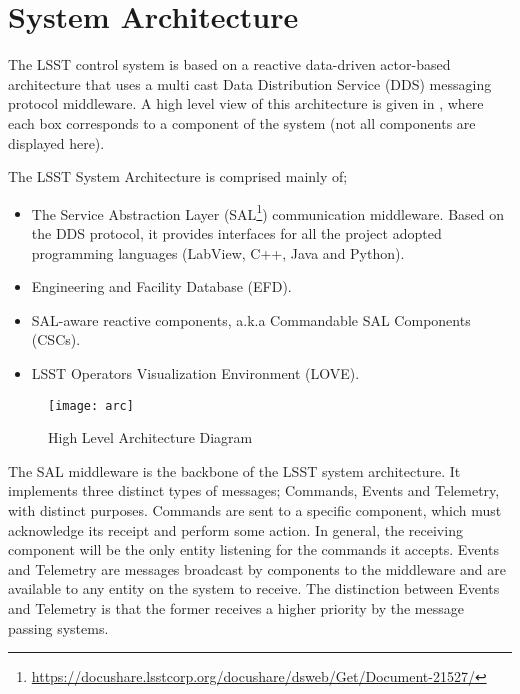 \section{System Architecture} \label{sec:sysarc}


The LSST control system is based on a reactive data-driven actor-based architecture that uses a multi cast Data Distribution Service (DDS) messaging protocol middleware. A high level view of this architecture is given in , where each box corresponds to a component of the system (not all components are displayed here).

The LSST System Architecture is comprised mainly of;
%
\begin{itemize}
\item The Service Abstraction Layer (SAL\footnote{\url{https://docushare.lsstcorp.org/docushare/dsweb/Get/Document-21527/}}) communication middleware. Based on the DDS protocol, it provides interfaces for all the project adopted programming languages (LabView, C++, Java and Python).
\item Engineering and Facility Database (EFD).
\item SAL-aware reactive components, a.k.a Commandable SAL Components (CSCs).
\item LSST Operators Visualization Environment (LOVE).
\end{itemize}

\begin{figure}
\begin{center}
\texttt{[image: arc]}
\caption{High Level Architecture Diagram\label{fig:arc}}
\end{center}
\end{figure}

The SAL middleware is the backbone of the LSST system architecture. It implements three distinct types of messages; Commands, Events and Telemetry, with distinct purposes. Commands are sent to a specific component, which must acknowledge its receipt and perform some action. In general, the receiving component will be the only entity listening for the commands it accepts. Events and Telemetry are messages broadcast by components to the middleware and are available to any entity on the system to receive. The distinction between Events and Telemetry is that the former receives a higher priority by the message passing systems.

